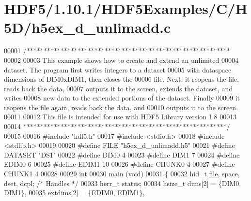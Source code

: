 \hypertarget{_h_d_f5_21_810_81_2_h_d_f5_examples_2_c_2_h5_d_2h5ex__d__unlimadd_8c_source}{}\section{H\+D\+F5/1.10.1/\+H\+D\+F5\+Examples/\+C/\+H5\+D/h5ex\+\_\+d\+\_\+unlimadd.c}
\label{_h_d_f5_21_810_81_2_h_d_f5_examples_2_c_2_h5_d_2h5ex__d__unlimadd_8c_source}

\begin{DoxyCode}
00001 \textcolor{comment}{/************************************************************}
00002 \textcolor{comment}{}
00003 \textcolor{comment}{  This example shows how to create and extend an unlimited}
00004 \textcolor{comment}{  dataset.  The program first writes integers to a dataset}
00005 \textcolor{comment}{  with dataspace dimensions of DIM0xDIM1, then closes the}
00006 \textcolor{comment}{  file.  Next, it reopens the file, reads back the data,}
00007 \textcolor{comment}{  outputs it to the screen, extends the dataset, and writes}
00008 \textcolor{comment}{  new data to the extended portions of the dataset.  Finally}
00009 \textcolor{comment}{  it reopens the file again, reads back the data, and}
00010 \textcolor{comment}{  outputs it to the screen.}
00011 \textcolor{comment}{}
00012 \textcolor{comment}{  This file is intended for use with HDF5 Library version 1.8}
00013 \textcolor{comment}{}
00014 \textcolor{comment}{ ************************************************************/}
00015 
00016 \textcolor{preprocessor}{#include "hdf5.h"}
00017 \textcolor{preprocessor}{#include <stdio.h>}
00018 \textcolor{preprocessor}{#include <stdlib.h>}
00019 
00020 \textcolor{preprocessor}{#define FILE            "h5ex\_d\_unlimadd.h5"}
00021 \textcolor{preprocessor}{#define DATASET         "DS1"}
00022 \textcolor{preprocessor}{#define DIM0            4}
00023 \textcolor{preprocessor}{#define DIM1            7}
00024 \textcolor{preprocessor}{#define EDIM0           6}
00025 \textcolor{preprocessor}{#define EDIM1           10}
00026 \textcolor{preprocessor}{#define CHUNK0          4}
00027 \textcolor{preprocessor}{#define CHUNK1          4}
00028 
00029 \textcolor{keywordtype}{int}
00030 main (\textcolor{keywordtype}{void})
00031 \{
00032     hid\_t           \hyperlink{structfile}{file}, space, dset, dcpl;    \textcolor{comment}{/* Handles */}
00033     herr\_t          status;
00034     hsize\_t         dims[2] = \{DIM0, DIM1\},
00035                     extdims[2] = \{EDIM0, EDIM1\},

\end{DoxyCode}
